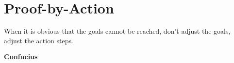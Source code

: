 \setchapterpreamble[u]{\margintoc}
\chapter{Proof-by-Action}

\epigraph{ When it is obvious that the goals cannot be reached, don't adjust the
goals, adjust the action steps.}{\textbf{Confucius}}


\begin{scope}







\end{scope}
